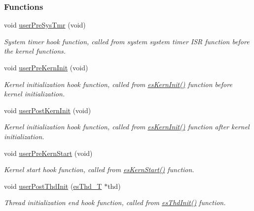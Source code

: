 \subsubsection*{Functions}
\begin{DoxyCompactItemize}
\item 
void \hyperlink{group__kern__hook_ga9a0d562969acef0121136b11be7b4728}{user\-Pre\-Sys\-Tmr} (void)
\begin{DoxyCompactList}\small\item\em System timer hook function, called from system system timer I\-S\-R function before the kernel functions. \end{DoxyCompactList}\item 
void \hyperlink{group__kern__hook_gaac77966856c9a299cda4794cbcc87edf}{user\-Pre\-Kern\-Init} (void)
\begin{DoxyCompactList}\small\item\em Kernel initialization hook function, called from \hyperlink{group__kern__general_ga9e9ff699d62d6035cd51121bb3140704}{es\-Kern\-Init()} function before kernel initialization. \end{DoxyCompactList}\item 
void \hyperlink{group__kern__hook_ga3579ac6964a314ad03d13da0507f57e8}{user\-Post\-Kern\-Init} (void)
\begin{DoxyCompactList}\small\item\em Kernel initialization hook function, called from \hyperlink{group__kern__general_ga9e9ff699d62d6035cd51121bb3140704}{es\-Kern\-Init()} function after kernel initialization. \end{DoxyCompactList}\item 
void \hyperlink{group__kern__hook_gaac505ab4c72e0fb346ca441d6def327d}{user\-Pre\-Kern\-Start} (void)
\begin{DoxyCompactList}\small\item\em Kernel start hook function, called from \hyperlink{group__kern__general_ga0e7a0a6b9c02df58de0f98de0229a09d}{es\-Kern\-Start()} function. \end{DoxyCompactList}\item 
void \hyperlink{group__kern__hook_ga64ca864d0ff2aaa532208d7c2b88bdb3}{user\-Post\-Thd\-Init} (\hyperlink{group__kern__thd_ga62e3a3ca0a4597a19c43cb8868810d82}{es\-Thd\-\_\-\-T} $\ast$thd)
\begin{DoxyCompactList}\small\item\em Thread initialization end hook function, called from \hyperlink{group__kern__thd_gac91734f3ee867b519f59bf81cc7fde88}{es\-Thd\-Init()} function. \end{DoxyCompactList}\item 

\end{DoxyCompactItemize}
